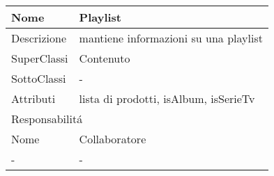\begin{center} %
    \begin{longtable}{ |p{3cm}|p{3cm}|p{3cm}|p{3cm}| }
        \hline
        Nome & \multicolumn{3}{|p{9cm}|}{Playlist} \\\hline
        Descrizione & \multicolumn{3}{|p{9cm}|}{mantiene informazioni su una playlist} \\\hline
        SuperClassi & \multicolumn{3}{|p{9cm}|}{Contenuto} \\\hline
        SottoClassi & \multicolumn{3}{|p{9cm}|}{-} \\\hline
        Attributi & \multicolumn{3}{|p{9cm}|}{lista di prodotti, isAlbum, isSerieTv} \\\hline
        \multicolumn{4}{|p{12cm}|}{Responsabilit\'a} \\\hline %
        \multicolumn{2}{|p{6cm}|}{Nome} & \multicolumn{2}{|p{6cm}|}{Collaboratore} \\\hline
        \multicolumn{2}{|p{6cm}|}{-} & \multicolumn{2}{|p{6cm}|}{-} \\\hline
    \end{longtable}
\end{center}

